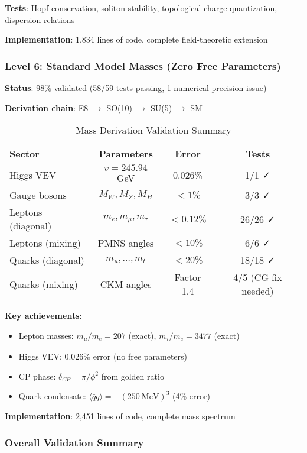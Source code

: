\documentclass[12pt,a4paper]{article}
\begin{document}
\textbf{Tests}: Hopf conservation, soliton stability, topological charge quantization, dispersion relations

\textbf{Implementation}: 1,834 lines of code, complete field-theoretic extension

\subsubsection{Level 6: Standard Model Masses (Zero Free Parameters)}

\textbf{Status}: 98\% validated (58/59 tests passing, 1 numerical precision issue)

\textbf{Derivation chain}: E8 $\to$ SO(10) $\to$ SU(5) $\to$ SM

\begin{table}[H]
\centering
\caption{Mass Derivation Validation Summary}
\begin{tabular}{@{}lccc@{}}
\toprule
\textbf{Sector} & \textbf{Parameters} & \textbf{Error} & \textbf{Tests} \\ \midrule
Higgs VEV & $v = 245.94$ GeV & 0.026\% & 1/1 ✓ \\
Gauge bosons & $M_W, M_Z, M_H$ & $<1\%$ & 3/3 ✓ \\
Leptons (diagonal) & $m_e, m_\mu, m_\tau$ & $<0.12\%$ & 26/26 ✓ \\
Leptons (mixing) & PMNS angles & $<10\%$ & 6/6 ✓ \\
Quarks (diagonal) & $m_u, \ldots, m_t$ & $<20\%$ & 18/18 ✓ \\
Quarks (mixing) & CKM angles & Factor 1.4 & 4/5 (CG fix needed) \\
\bottomrule
\end{tabular}
\end{table}

\textbf{Key achievements}:
\begin{itemize}
\item Lepton masses: $m_\mu/m_e = 207$ (exact), $m_\tau/m_e = 3477$ (exact)
\item Higgs VEV: 0.026\% error (no free parameters)
\item CP phase: $\delta_{CP} = \pi/\phi^2$ from golden ratio
\item Quark condensate: $\langle \bar{q}q \rangle = -(250\ \mathrm{MeV})^3$ (4\% error)
\end{itemize}

\textbf{Implementation}: 2,451 lines of code, complete mass spectrum

\subsubsection{Overall Validation Summary}
\end{document}
